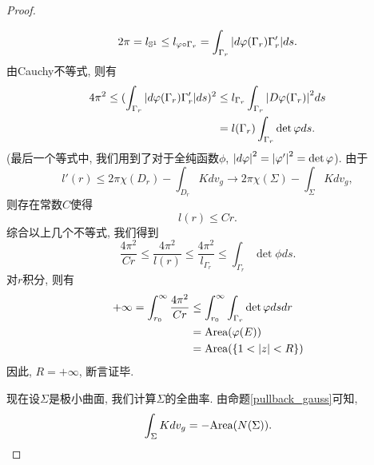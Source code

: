 \begin{proof}
\begin{claim}
\begin{subproof}
            \begin{equation}
                2\pi = l_{\mathbb{S}^1} \le l_{{\varphi}\circ \Gamma_r} = \int_{\Gamma_r} {\left | d {\varphi}(\Gamma_r)\Gamma'_r \right |}ds.
            \end{equation}
            由Cauchy不等式, 则有
            \begin{equation}
                \begin{split}
                    4\pi^2 \le (\int_{\Gamma_r} {\left | d{\varphi}(\Gamma_r)\Gamma'_r \right |}ds)^2 & \le l_{\Gamma_r}\int_{\Gamma_r}{\left | D{\varphi}(\Gamma_r) \right |}^2ds \\
                    & =l(\Gamma_r)\int_{\Gamma_r}\det {\varphi} ds.
                \end{split}
            \end{equation}
            (最后一个等式中, 我们用到了对于全纯函数$\phi$, ${\left | d{\varphi} \right |}^2 = {\left | {\varphi}' \right |}^2= \det {\varphi}$). 由于
            \begin{equation}
                l'(r) \le 2\pi\chi(D_r) - \int_{D_r}Kdv_g \to 2\pi\chi(\Sigma) - \int_\Sigma K dv_g,
            \end{equation}
            则存在常数$C$使得 
            \begin{equation}
                l(r) \le Cr.
            \end{equation}
            综合以上几个不等式, 我们得到
            \begin{equation}
                \frac{4\pi^2}{Cr} \le \frac{4\pi^2}{l(r)} \le \frac{4\pi^2}{l_{\Gamma_r}} \le \int_{\Gamma_r}\det\phi ds.
            \end{equation}
            对$r$积分, 则有
            \begin{equation}
                \begin{split}
                    +\infty = \int^\infty_{r_0} \frac{4\pi^2}{Cr} &\le \int^\infty_{r_0}\int_{\Gamma_r} \det{\varphi} dsdr  \\
                    &=\text{Area}({\varphi}(E)) \\
                    &= \text{Area}(\{1<{\left | z \right |}< R\}) 
                \end{split}
            \end{equation}
            因此, $R=+\infty$, 断言证毕.
        \end{subproof}
    \end{claim}
    现在设$\Sigma$是极小曲面, 我们计算$\Sigma$的全曲率.  由命题\eqref{pullback_gauss}可知,
    \begin{equation}
        \int_\Sigma K dv_g = - \text{Area}(N(\Sigma)).
    \end{equation}

\end{proof}
